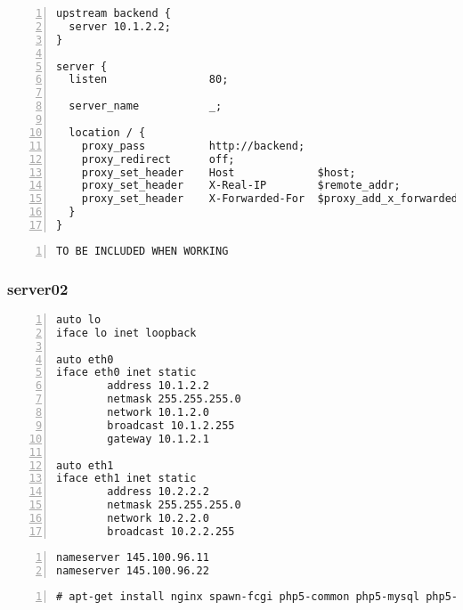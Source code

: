\documentclass[Configuration]{subfiles}
\begin{document}
\begin{lstlisting}[frame=single,caption=/etc/nginx/sites-enabled/wordpress,backgroundcolor=\color{gray},breaklines=true,numbers=left,]
upstream backend {
  server 10.1.2.2;
}

server {
  listen                80;

  server_name           _;

  location / {
    proxy_pass          http://backend;
    proxy_redirect      off;
    proxy_set_header    Host             $host;
    proxy_set_header    X-Real-IP        $remote_addr;
    proxy_set_header    X-Forwarded-For  $proxy_add_x_forwarded_for;
  }
}
\end{lstlisting}

\begin{lstlisting}[frame=single,caption=/etc/nginx/nbs.rules,backgroundcolor=\color{gray},breaklines=true,numbers=left,]
TO BE INCLUDED WHEN WORKING
\end{lstlisting}

\subsubsection{server02}
\label{sec:server02_configuration}


\begin{lstlisting}[frame=single,caption=/etc/network/interfaces,backgroundcolor=\color{gray},breaklines=true,numbers=left,]
auto lo
iface lo inet loopback

auto eth0
iface eth0 inet static
        address 10.1.2.2
        netmask 255.255.255.0
        network 10.1.2.0
        broadcast 10.1.2.255
        gateway 10.1.2.1

auto eth1
iface eth1 inet static
        address 10.2.2.2
        netmask 255.255.255.0
        network 10.2.2.0
        broadcast 10.2.2.255
\end{lstlisting}

\begin{lstlisting}[frame=single,caption=/etc/resolv.conf,backgroundcolor=\color{gray},breaklines=true,numbers=left,]
nameserver 145.100.96.11
nameserver 145.100.96.22
\end{lstlisting}

\begin{lstlisting}[frame=single,caption=necessary packages,backgroundcolor=\color{gray},breaklines=true,numbers=left,]
# apt-get install nginx spawn-fcgi php5-common php5-mysql php5-xmlrpc php5-cgi php5-curl php5-gd php5-cli  php-apc php-pear php5-dev php5-imap php5-mcrypt
\end{lstlisting}
\end{document}
